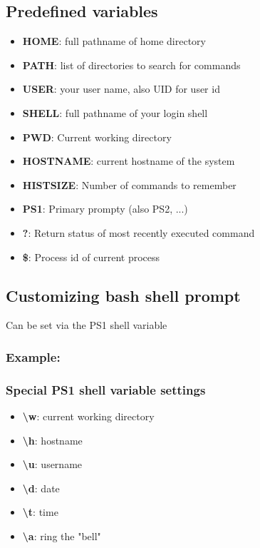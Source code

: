 \documentclass{report}
\begin{document}
    \subsection{Predefined variables}
    \begin{itemize}
        \item \textbf{HOME}: full pathname of home directory
        \item \textbf{PATH}: list of directories to search for commands
        \item \textbf{USER}: your user name, also UID for user id
        \item \textbf{SHELL}: full pathname of your login shell
        \item \textbf{PWD}: Current working directory
        \item \textbf{HOSTNAME}: current hostname of the system
        \item \textbf{HISTSIZE}: Number of commands to remember
        \item \textbf{PS1}: Primary prompty (also PS2, ...)
        \item \textbf{?}: Return status of most recently executed command
        \item \textbf{\$}: Process id of current process
    \end{itemize}

    \bigbreak \noindent 
    \subsection{Customizing bash shell prompt}
    \bigbreak \noindent 
    Can be set via the PS1 shell variable
    \bigbreak \noindent 
    \subsubsection{Example:}
    \bigbreak \noindent 
    \subsubsection{Special PS1 shell variable settings}
    \begin{itemize}
        \item \textbf{\textbackslash w}: current working directory
        \item \textbf{\textbackslash h}: hostname
        \item \textbf{\textbackslash u}: username
        \item \textbf{\textbackslash d}: date
        \item \textbf{\textbackslash t}: time
        \item \textbf{\textbackslash a}: ring the "bell"
    \end{itemize}
\end{document}
